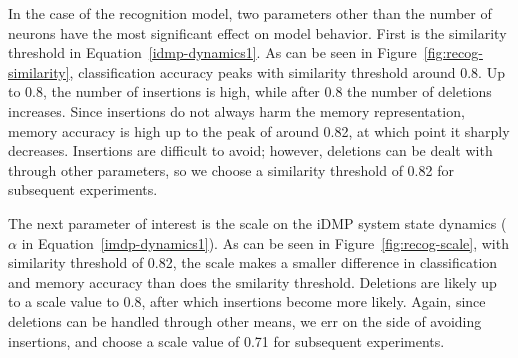 
In the case of the recognition model,
two parameters other than the number of neurons
have the most significant effect on model behavior.
First is the similarity threshold
in Equation~\eqref{idmp-dynamics1}.
As can be seen in Figure~\ref{fig:recog-similarity},
classification accuracy peaks with
similarity threshold around 0.8.
Up to 0.8, the number of insertions
is high, while after 0.8
the number of deletions increases.
Since insertions do not always harm
the memory representation,
memory accuracy is high
up to the peak of around 0.82,
at which point it sharply decreases.
Insertions are difficult to avoid;
however, deletions can be dealt
with through other parameters,
so we choose a similarity threshold of
0.82 for subsequent experiments.


The next parameter of interest is the
scale on the iDMP system state dynamics
($\alpha$ in Equation~\eqref{imdp-dynamics1}).
As can be seen in Figure~\ref{fig:recog-scale},
with similarity threshold of 0.82,
the scale makes a smaller difference
in classification and memory accuracy
than does the smilarity threshold.
Deletions are likely up to
a scale value to 0.8,
after which insertions become more likely.
Again, since deletions can be handled
through other means,
we err on the side of avoiding insertions,
and choose a scale value of 0.71
for subsequent experiments.


